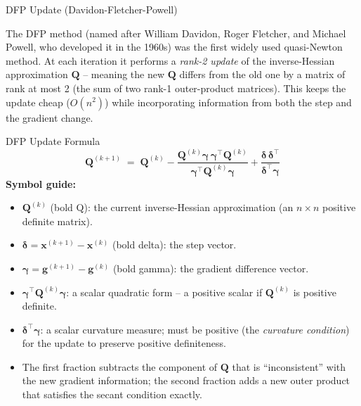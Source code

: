 \documentclass[aspectratio=169,10pt]{beamer}
\newcommand{\xbf}{\mathbf{x}}
\newcommand{\gbf}{\mathbf{g}}
\newcommand{\deltabf}{\boldsymbol{\delta}}
\newcommand{\gammabf}{\boldsymbol{\gamma}}
\begin{document}
\begin{frame}[allowframebreaks]{DFP Update (Davidon-Fletcher-Powell)}

  The DFP method (named after William Davidon, Roger Fletcher, and Michael
  Powell, who developed it in the 1960s) was the first widely used quasi-Newton
  method.  At each iteration it performs a \emph{rank-2 update} of the
  inverse-Hessian approximation $\mathbf{Q}$ -- meaning the new $\mathbf{Q}$
  differs from the old one by a matrix of rank at most 2 (the sum of two
  rank-1 outer-product matrices).  This keeps the update cheap ($O(n^2)$) while
  incorporating information from both the step and the gradient change.

  \begin{block}{DFP Update Formula}
    \[
      \mathbf{Q}^{(k+1)} \;=\; \mathbf{Q}^{(k)}
        - \frac{\mathbf{Q}^{(k)}\gammabf\,\gammabf^\top \mathbf{Q}^{(k)}}
               {\gammabf^\top \mathbf{Q}^{(k)}\gammabf}
        + \frac{\deltabf\,\deltabf^\top}{\deltabf^\top\gammabf}
    \]
    \textbf{Symbol guide:}
    \begin{itemize}
      \item $\mathbf{Q}^{(k)}$ (bold Q): the current inverse-Hessian approximation
        (an $n\times n$ positive definite matrix).
      \item $\deltabf = \xbf^{(k+1)} - \xbf^{(k)}$ (bold delta): the step vector.
      \item $\gammabf = \gbf^{(k+1)} - \gbf^{(k)}$ (bold gamma): the gradient
        difference vector.
      \item $\gammabf^\top \mathbf{Q}^{(k)}\gammabf$: a scalar quadratic form --
        a positive scalar if $\mathbf{Q}^{(k)}$ is positive definite.
      \item $\deltabf^\top\gammabf$: a scalar curvature measure; must be positive
        (the \emph{curvature condition}) for the update to preserve positive
        definiteness.
      \item The first fraction subtracts the component of $\mathbf{Q}$ that is
        ``inconsistent'' with the new gradient information; the second fraction
        adds a new outer product that satisfies the secant condition exactly.
    \end{itemize}
  \end{block}


\end{frame}
\end{document}
